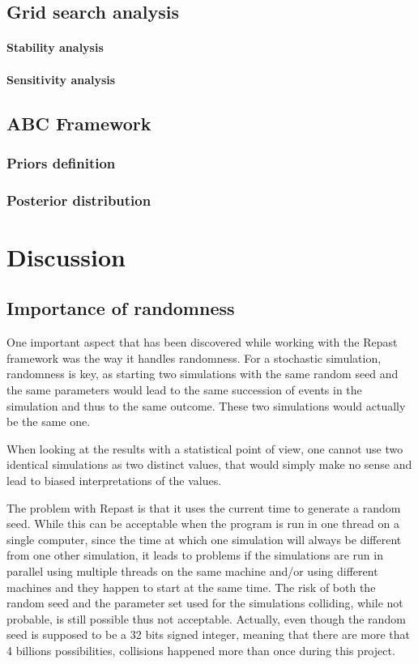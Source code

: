 \documentclass[a4paper,12pt]{report}
\begin{document}
\section{Grid search analysis}

\subsubsection{Stability analysis}


\subsubsection{Sensitivity analysis}


\section{ABC Framework}

\subsection{Priors definition}


\subsection{Posterior distribution}




\chapter{Discussion}

\section{Importance of randomness}
One important aspect that has been discovered while working with the Repast framework was the way it handles randomness. For a stochastic simulation, randomness is key, as starting two simulations with the same random seed and the same parameters would lead to the same succession of events in the simulation and thus to the same outcome. These two simulations would actually be the same one.

When looking at the results with a statistical point of view, one cannot use two identical simulations as two distinct values, that would simply make no sense and lead to biased interpretations of the values.

The problem with Repast is that it uses the current time to generate a random seed. While this can be acceptable when the program is run in one thread on a single computer, since the time at which one simulation will always be different from one other simulation, it leads to problems if the simulations are run in parallel using multiple threads on the same machine and/or using different machines and they happen to start at the same time. The risk of both the random seed and the parameter set used for the simulations colliding, while not probable, is still possible thus not acceptable. Actually, even though the random seed is supposed to be a 32 bits signed integer, meaning that there are more that 4 billions possibilities, collisions happened more than once during this project.
\end{document}
